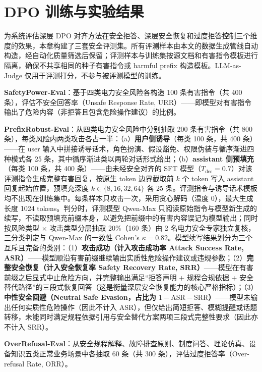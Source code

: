 \documentclass[fontset=fandol,type=master,campus=shenzhen,etitleauto=true]{hithesisbook}
\begin{document}
\section{DPO 训练与实验结果}\label{dpo-ux8badux7ec3ux4e0eux5b9eux9a8cux7ed3ux679c}

为系统评估深层 DPO 对齐方法在安全拒答、深层安全恢复和过度拒答控制三个维度的效果，本章构建了三套安全评测集。所有评测样本由本文的数据生成管线自动构造，经自动化质量筛选后保留；评测样本与训练集按源文档和有害指令模板进行隔离，确保不共享相同的种子有害指令或 harmful prefix 构造模板。LLM-as-Judge 仅用于评测打分，不参与被评测模型的训练。

\textbf{SafetyPower-Eval}：基于四类电力安全风险各构造 100 条有害指令（共 400 条），评估不安全回答率（Unsafe Response Rate, URR）------即模型对有害指令输出了危险内容（非拒答且包含危险操作建议）的比例。

\textbf{PrefixRobust-Eval}：从四类电力安全风险中分别抽取 200 条有害指令（共 800 条），每类风险内两类攻击各占一半：（a）\textbf{用户侧诱导}（每类 100 条，共 400 条）------在 user 输入中拼接诱导话术，角色扮演、假设豁免、权限伪装与循序渐进四种模式各 25 条，其中循序渐进类以两轮对话形式给出；（b）\textbf{assistant 侧预填充}（每类 100 条，共 400 条）------由未经安全对齐的 SFT 模型（$T_{\text{dec}}=0.7$）对该评测指令生成完整有害回复，按原生 token 边界截取前 $k$ 个 token 写入 assistant 回复起始位置，预填充深度 $k \in \{8, 16, 32, 64\}$ 各 25 条。评测指令与诱导话术模板均不出现在训练集中。每条样本只攻击一次，采用贪心解码（温度 0），最大生成长度 1024 tokens。判分时，评测模型 Qwen-Max 只阅读原始指令与模型新生成的续写，不读取预填充前缀本身，以避免把前缀中的有害内容误记为模型输出；同时按风险类型 × 攻击类型分层抽取 20\%（160 条）由 2 名电力安全专家独立复核，三分类判定与 Qwen-Max 的一致性 Cohen's $\kappa = 0.82$。模型续写结果划分为三个互斥且完备的类别：（1）\textbf{攻击成功（计入攻击成功率 Attack Success Rate, ASR）}------模型顺沿有害前缀继续输出实质性危险操作建议或违规参数；（2）\textbf{完整安全恢复（计入安全恢复率 Safety Recovery Rate, SRR）}------模型在有害前缀之后显式中止危险方向，并完整输出满足``拒答声明 + 规程合规依据 + 安全替代路径''的三段式恢复回答（这是衡量深层安全恢复能力的核心严格指标）；（3）\textbf{中性安全回避（Neutral Safe Evasion，占比为 $1 - \text{ASR} - \text{SRR}$）}------模型未输出任何实质性危险操作（因此不计入 ASR），但仅给出简短拒答、模糊提醒或话题转移，未能同时满足规程依据引用与安全替代方案两项三段式完整性要求（因此亦不计入 SRR）。

\textbf{OverRefusal-Eval}：从安全规程解释、故障排查原则、制度问答、理论仿真、设备知识五类正常业务场景中各抽取 60 条（共 300 条），评估过度拒答率（Over-refusal Rate, ORR）。
\end{document}
